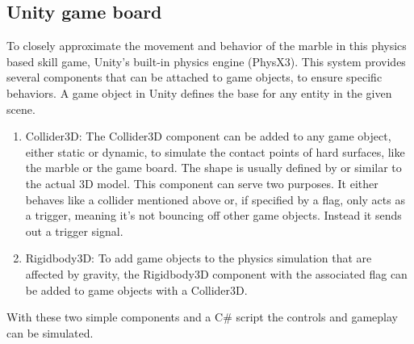\subsection{Unity game board}\label{subsec:unity-game-board}
To closely approximate the movement and behavior of the marble in this physics based skill game,
Unity's built-in physics engine (PhysX3).
This system provides several components that can be attached to game objects, to ensure specific behaviors.
A game object in Unity defines the base for any entity in the given scene.
\begin{enumerate}
    \item{Collider3D}: The Collider3D component can be added to any game object, either static or dynamic, to simulate the contact points of hard surfaces, like the marble or the game board.
    The shape is usually defined by or similar to the actual 3D model.
    This component can serve two purposes.
    It either behaves like a collider mentioned above or, if specified by a flag, only acts as a trigger, meaning it's not bouncing off other game objects.
    Instead it sends out a trigger signal.
    \item{Rigidbody3D}: To add game objects to the physics simulation that are affected by gravity, the Rigidbody3D component with the associated flag can be added to game objects with a Collider3D.
\end{enumerate}
With these two simple components and a C# script the controls and gameplay can be simulated.